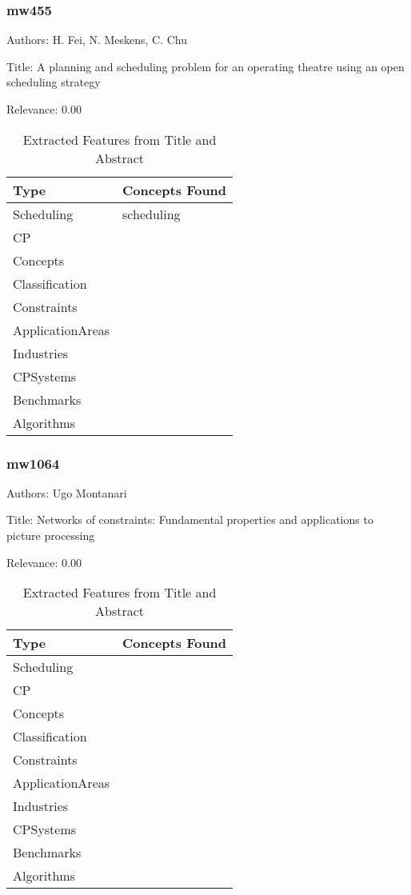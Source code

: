 \subsubsection{mw455}
\label{mw:mw455}

Authors: H. Fei, N. Meskens, C. Chu

Title: A planning and scheduling problem for an operating theatre using an open scheduling strategy

Relevance:  0.00

{\scriptsize
\begin{longtable}{p{2cm}p{20cm}}
\caption{Extracted Features from Title and Abstract}\\ \toprule
Type & Concepts Found\\ \midrule
\endhead
\bottomrule
\endfoot
Scheduling & scheduling\\ 
CP & \\ 
Concepts & \\ 
Classification & \\ 
Constraints & \\ 
ApplicationAreas & \\ 
Industries & \\ 
CPSystems & \\ 
Benchmarks & \\ 
Algorithms & \\ 
\end{longtable}
}



\subsubsection{mw1064}
\label{mw:mw1064}

Authors: Ugo Montanari

Title: Networks of constraints: Fundamental properties and applications to picture processing

Relevance:  0.00

{\scriptsize
\begin{longtable}{p{2cm}p{20cm}}
\caption{Extracted Features from Title and Abstract}\\ \toprule
Type & Concepts Found\\ \midrule
\endhead
\bottomrule
\endfoot
Scheduling & \\ 
CP & \\ 
Concepts & \\ 
Classification & \\ 
Constraints & \\ 
ApplicationAreas & \\ 
Industries & \\ 
CPSystems & \\ 
Benchmarks & \\ 
Algorithms & \\ 
\end{longtable}
}



